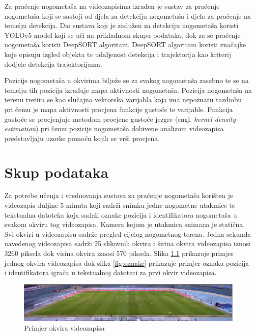\documentclass[times, utf8, seminar, numeric]{fer}
\begin{document}
Za praćenje nogometaša na videozapisima izrađen je sustav za praćenje nogometaša koji se sastoji od djela za detekciju nogometaša i djela za praćenje na temelju detekcija. Dio sustava koji je zadužen za detekciju nogometaša koristi YOLOv5 model koji se uči na prikladnom skupu podataka, dok za se praćenje nogometaša koristi DeepSORT algoritam. DeepSORT algoritam koristi značajke koje opisuju izgled objekta te udaljenost detekcija i trajektorija kao kriterij dodjele detekcija trajektorijama.

Pozicije nogometaša u okvirima bilježe se za svakog nogometaša zasebno te se na temelju tih pozicija izrađuje mapa aktivnosti nogometaša. Pozicija nogometaša na terenu tretira se kao slučajna vektorska varijabla koja ima nepoznatu razdiobu pri čemu je mapa aktivnosti procjena funkcije gustoće te varijable. Funkcija gustoće se procjenjuje metodom procjene gustoće jezgre (engl. \textit{kernel density estimation}) pri čemu pozicije nogometaša dobivene analizom videozapisa predstavljaju uzorke pomoću kojih se vrši procjena.



\chapter{Skup podataka}

Za potrebe učenja i vrednovanja sustava za praćenje nogometaša  korišten je videozapis duljine 5 minuta koji sadrži snimku jedne nogometne utakmice te tekstualna datoteka koja sadrži oznake pozicija i identifikatora  nogometaša u svakom okviru tog videozapisa. Kamera kojom je utakmica snimana je statična. Svi okviri u videozapisu sadrže pregled cijelog nogometnog terena.
Jedna sekunda navedenog videozapisa sadrži 25 slikovnih okvira i širina okvira videozapisa iznosi 3260 piksela dok visina okvira iznosi 570 piksela.
Slika \ref{fig:okvir} prikazuje primjer jednog okvira videozapisa dok
slika \ref{fig:oznake} prikazuje primjer oznaka pozicija i identifikatora igrača u tekstualnoj datoteci za prvi okvir videozapisa.

\begin{figure}
	\centering
	\includegraphics[width=\linewidth]{slike/okvir.png}
	\caption {Primjer okvira videozapisa}
	\label{fig:okvir}	
\end{figure}
\end{document}
